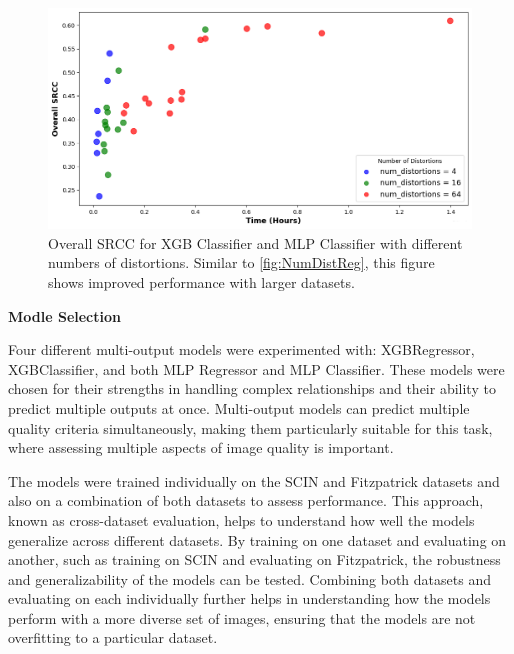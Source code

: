 \begin{figure}[ht]
    \centering
    \includegraphics[keepaspectratio,width=15cm]{img/num_dist_cls.png}
    \caption{Overall SRCC for XGB Classifier and MLP Classifier with different numbers of distortions. Similar to \autoref{fig:NumDistReg}, this figure shows improved performance with larger datasets.}
    \label{fig:NumDistCls}
\end{figure}
\vspace{\baselineskip}
\noindent
\textbf{Modle Selection} \par
\noindent
Four different multi-output models were experimented with: XGBRegressor, XGBClassifier, and both MLP Regressor and MLP Classifier. These models were chosen for their strengths in handling complex relationships and their ability to predict multiple outputs at once. Multi-output models can predict multiple quality criteria simultaneously, making them particularly suitable for this task, where assessing multiple aspects of image quality is important. \par
\vspace{\baselineskip}
\noindent
The models were trained individually on the SCIN and Fitzpatrick datasets and also on a combination of both datasets to assess performance. This approach, known as cross-dataset evaluation, helps to understand how well the models generalize across different datasets. By training on one dataset and evaluating on another, such as training on SCIN and evaluating on Fitzpatrick, the robustness and generalizability of the models can be tested. Combining both datasets and evaluating on each individually further helps in understanding how the models perform with a more diverse set of images, ensuring that the models are not overfitting to a particular dataset. \par 
\vspace{\baselineskip}
\noindent
